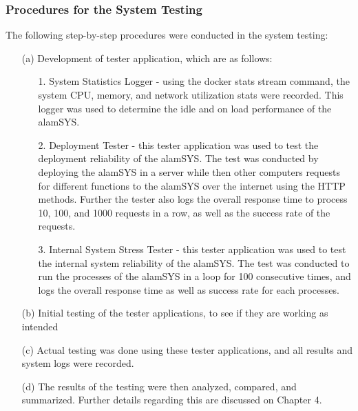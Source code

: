 \subsubsection{Procedures for the System Testing}
\label{subsubsec:proc_mobdev}
The following step-by-step procedures were conducted in the system testing:
\begin{itemize}
    \item[(a)] Development of tester application, which are as follows:
    \begin{itemize}
        \item[1.] System Statistics Logger - using the docker stats stream command, the system 
        CPU, memory, and network utilization stats were recorded. This logger was used
        to determine the idle and on load performance of the alamSYS.
        \item[2.] Deployment Tester - this tester application was used to test the deployment
        reliability of the alamSYS. The test was conducted by deploying the alamSYS in a server
        while then other computers requests for different functions to the alamSYS over the internet
        using the HTTP methods. Further the tester also logs the overall response time to
        process 10, 100, and 1000 requests in a row, as well as the success rate of the
        requests.
        \item[3.] Internal System Stress Tester - this tester application was used to test the
        internal system reliability of the alamSYS. The test was conducted to run the processes
        of the alamSYS in a loop for 100 consecutive times, and logs the overall response time
        as well as success rate for each processes.
    \end{itemize}
    \item[(b)] Initial testing of the tester applications, to see if
    they are working as intended
    \item[(c)] Actual testing was done using these tester applications, and
    all results and system logs were recorded.
    \item[(d)] The results of the testing were then analyzed, compared, and summarized.
    Further details regarding this are discussed on Chapter 4.
\end{itemize}
